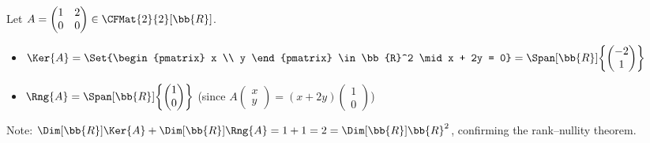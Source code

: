 \begin{example}
    Let $A = \begin{pmatrix} 1 & 2 \\ 0 & 0 \end{pmatrix} \in \CFMat{2}{2}[\bb{R}]$.
    \begin{itemize}
        \item $\Ker{A} = \Set{\begin{pmatrix} x \\ y \end{pmatrix} \in \bb{R}^2 \mid x + 2y = 0}
              = \Span[\bb{R}]{\left\{\begin{pmatrix} -2 \\ 1 \end{pmatrix}\right\}}$
        \item $\Rng{A} = \Span[\bb{R}]{\left\{\begin{pmatrix} 1 \\ 0 \end{pmatrix}\right\}}$
              (since $A \begin{pmatrix} x \\ y \end{pmatrix}
              = (x + 2y) \begin{pmatrix} 1 \\ 0 \end{pmatrix}$)
    \end{itemize}
    Note: $\Dim[\bb{R}]{\Ker{A}} + \Dim[\bb{R}]{\Rng{A}} = 1 + 1 = 2 = \Dim[\bb{R}]{\bb{R}^2}$,
    confirming the rank--nullity theorem.
\end{example}
